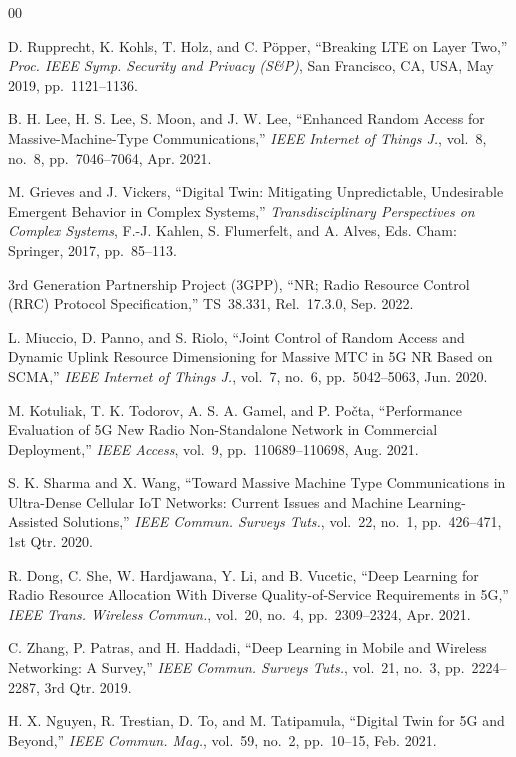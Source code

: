 \documentclass[conference]{IEEEtran}
\begin{document}
\begin{thebibliography}{00}

D. Rupprecht, K. Kohls, T. Holz, and C. Pöpper,
``Breaking LTE on Layer Two,''
\emph{Proc. IEEE Symp. Security and Privacy (S\&P)},
San Francisco, CA, USA, May 2019, pp.~1121--1136.

B. H. Lee, H. S. Lee, S. Moon, and J. W. Lee,
``Enhanced Random Access for Massive-Machine-Type Communications,''
\emph{IEEE Internet of Things J.},
vol.~8, no.~8, pp.~7046--7064, Apr. 2021.

M. Grieves and J. Vickers,
``Digital Twin: Mitigating Unpredictable, Undesirable Emergent Behavior in
Complex Systems,''
\emph{Transdisciplinary Perspectives on Complex Systems},
F.-J. Kahlen, S. Flumerfelt, and A. Alves, Eds.
Cham: Springer, 2017, pp.~85--113.

3rd Generation Partnership Project (3GPP),
``NR; Radio Resource Control (RRC) Protocol Specification,''
TS~38.331, Rel.~17.3.0, Sep. 2022.

L. Miuccio, D. Panno, and S. Riolo,
``Joint Control of Random Access and Dynamic Uplink Resource Dimensioning
for Massive MTC in 5G NR Based on SCMA,''
\emph{IEEE Internet of Things J.},
vol.~7, no.~6, pp.~5042--5063, Jun. 2020.

M. Kotuliak, T. K. Todorov, A. S. A. Gamel, and P. Počta,
``Performance Evaluation of 5G New Radio Non-Standalone Network in Commercial Deployment,''
\emph{IEEE Access},
vol.~9, pp.~110689--110698, Aug. 2021.

S. K. Sharma and X. Wang,
``Toward Massive Machine Type Communications in Ultra-Dense Cellular IoT
Networks: Current Issues and Machine Learning-Assisted Solutions,''
\emph{IEEE Commun. Surveys Tuts.},
vol.~22, no.~1, pp.~426--471, 1st Qtr. 2020.

R. Dong, C. She, W. Hardjawana, Y. Li, and B. Vucetic,
``Deep Learning for Radio Resource Allocation With Diverse Quality-of-Service
Requirements in 5G,''
\emph{IEEE Trans. Wireless Commun.},
vol.~20, no.~4, pp.~2309--2324, Apr. 2021.

C. Zhang, P. Patras, and H. Haddadi,
``Deep Learning in Mobile and Wireless Networking: A Survey,''
\emph{IEEE Commun. Surveys Tuts.},
vol.~21, no.~3, pp.~2224--2287, 3rd Qtr. 2019.

H. X. Nguyen, R. Trestian, D. To, and M. Tatipamula,
``Digital Twin for 5G and Beyond,''
\emph{IEEE Commun. Mag.},
vol.~59, no.~2, pp.~10--15, Feb. 2021.


\end{thebibliography}
\end{document}
